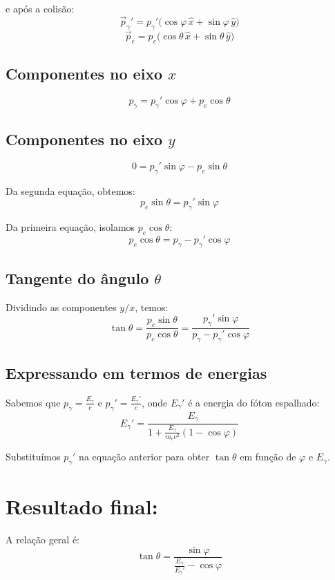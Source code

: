 \documentclass[a4paper,12pt]{article}
\begin{document}
\begin{flushleft}
e após a colisão:
\[
\vec{p}_\gamma' = p_\gamma' \bigl( \cos\varphi\,\hat{x} + \sin\varphi\,\hat{y} \bigr)
\]
\[
\vec{p}_e = p_e \bigl( \cos\theta\,\hat{x} + \sin\theta\,\hat{y} \bigr)
\]

\subsection*{Componentes no eixo \(x\)}

\[
p_\gamma = p_\gamma' \cos\varphi + p_e \cos\theta
\]

\subsection*{Componentes no eixo \(y\)}

\[
0 = p_\gamma' \sin\varphi - p_e \sin\theta
\]

Da segunda equação, obtemos:
\[
p_e \sin\theta = p_\gamma' \sin\varphi
\]

Da primeira equação, isolamos \( p_e \cos\theta \):
\[
p_e \cos\theta = p_\gamma - p_\gamma' \cos\varphi
\]

\subsection*{Tangente do ângulo \( \theta \)}

Dividindo as componentes \(y/x\), temos:
\[
\tan\theta = \frac{p_e \sin\theta}{p_e \cos\theta} =
\frac{p_\gamma' \sin\varphi}{p_\gamma - p_\gamma' \cos\varphi}
\]

\subsection*{Expressando em termos de energias}

Sabemos que \( p_\gamma = \frac{E_\gamma}{c} \) e \( p_\gamma' = \frac{E_\gamma'}{c} \), onde \( E_\gamma' \) é a energia do fóton espalhado:
\[
E_\gamma' = \frac{E_\gamma}{1 + \frac{E_\gamma}{m_e c^2}(1 - \cos\varphi)}
\]

Substituímos \( p_\gamma' \) na equação anterior para obter \( \tan\theta \) em função de \( \varphi \) e \( E_\gamma \).

\section*{Resultado final:}

A relação geral é:
\[
\tan\theta =
\frac{\sin\varphi}{\displaystyle \frac{E_\gamma}{E_\gamma'} - \cos\varphi}
\]


\end{flushleft}
\end{document}
